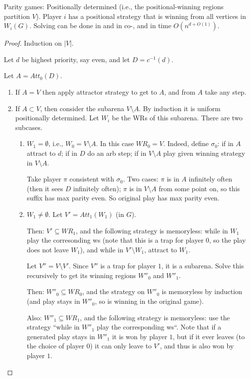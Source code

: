 \documentclass[a4paper,10pt]{article}
\begin{document}
\begin{theorem}
 Parity games:
\en 
\- Positionally determined (i.e., the positional-winning regions partition $V$).
\- Player $i$ has a positional strategy that is winning from all vertices in $W_i(G)$.
\- Solving can be done in \np and in co-\np, and in time $O(n^{d+O(1)})$.
\ne
\end{theorem}
\begin{proof}
 Induction on $|V|$. 
 
 Let $d$ be highest priority, say even, and let $D = c^{-1}(d)$. 
 
 Let $A = Att_0(D)$.
 
 \begin{enumerate}
  \item If $A = V$ then apply attractor strategy to get to $A$, and from $A$ take any step.
 
  \item If $A \subset V$, then consider the subarena $V \setminus A$. By induction it is uniform positionally determined. 
 Let $W_i$ be the WRs of this subarena.	There are two subcases.
 
 \begin{enumerate} 
 \item $W_1 = \emptyset$, i.e., $W_0 = V \setminus A$. In this case $WR_0 = V$. Indeed, define $\sigma_0$: if in $A$ attract to $d$; if in $D$ do an arb step; if in $V \setminus A$ play given winning strategy in $V \setminus A$.
 
 Take player $\pi$ consistent with $\sigma_0$. Two cases: $\pi$ is in $A$ infinitely often (then it sees $D$ infinitely often); $\pi$ is in $V \setminus A$ from some point on, so this suffix has max parity even. So original play has max parity even.
 
 \item $W_1 \neq \emptyset$. Let $V' = Att_1(W_1)$ (in $G$). 
 
 Then: $V' \subseteq WR_1$, and the following strategy is memoryless: while in $W_1$ play the corresonding ws (note that this is a trap for player $0$, so the play does not leave $W_1$), and while in $V' \setminus W_1$, attract to $W_1$. 
 
 Let $V'' = V \setminus V'$. Since $V''$ is a trap for player $1$, it is a subarena. Solve this recursively to get its winning regions $W''_0$ and $W''_1$. 
 
 Then: $W''_0 \subseteq WR_0$, and the strategy on $W''_0$ is memoryless by induction (and play stays in $W''_0$, so is winning in the original game).
 
 Also: $W''_1 \subseteq WR_1$, and the following strategy is memoryless: use the strategy ``while in $W''_1$ play the corresponding ws``. Note that if a generated play stays in $W''_1$ it is won by player $1$, but if it ever leaves (to the choice of player $0$) it can only leave to $V'$, and thus is also won by player $1$.
 \end{enumerate}
 \end{enumerate}
 \end{proof}
\end{document}
